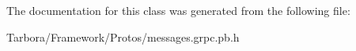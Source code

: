 The documentation for this class was generated from the following file\+:\begin{DoxyCompactItemize}
\item 
Tarbora/\+Framework/\+Protos/messages.\+grpc.\+pb.\+h\end{DoxyCompactItemize}
